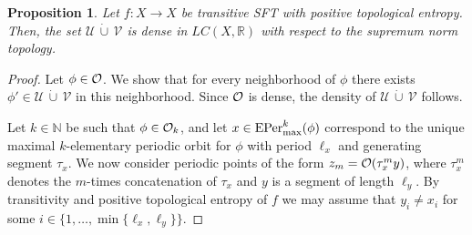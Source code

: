 \documentclass[11pt, reqno]{amsart}
\newtheorem{proposition}[theorem]{Proposition}
\newcommand{\EPer}{{\rm EPer}}
\newcommand{\bR}{{\mathbb R}}
\newcommand{\bN}{{\mathbb N}}
\newcommand{\cU}{{\mathcal U}}
\newcommand{\cV}{{\mathcal V}}
\def\EPer{{\rm EPer}}
\begin{document}
\begin{proposition}\label{prop:UV}
Let $f:X\to X$ be transitive SFT with positive topological entropy.  Then, the set $\cU\,\dot\cup\,\cV$ is dense in $LC(X,\bR)$ with respect to the supremum norm topology. 
\end{proposition}
\begin{proof}
Let $\phi\in\mathcal O$. We show that for every neighborhood of $\phi$ there exists $\phi'\in\cU\,\dot\cup\,\cV$ in this neighborhood.  Since $\mathcal O$ is dense, the density of $\cU\,\dot\cup\,\cV$ follows.  

Let $k\in \bN$ be such that $\phi\in\mathcal O_k$, and let $x\in\EPer_{\max}^k(\phi)$ correspond to the unique maximal $k$-elementary periodic orbit for $\phi$ with period $\ell_x$ and generating segment $\tau_x$.  We now consider periodic points of the form $z_m=\mathcal O(\tau_x^my)$, where $\tau_x^m$ denotes the $m$-times concatenation of $\tau_x$ and $y$ is a segment of length $\ell_y$.  By  transitivity and positive topological entropy of $f$ we may assume  that  $y_i\not=x_i$ for some
$i\in \{1,\dots ,\min\{\ell_x,\ell_y\}\}$.


\end{proof}
\end{document}
